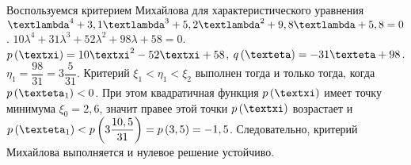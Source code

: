 \documentclass[a5paper,10pt]{article}
\begin{document}
Воспользуемся критерием Михайлова для характеристического уравнения 
$\lambda^4 + 3,1\lambda^3 \linebreak + 5,2 \lambda^2 + 9,8\lambda + 5,8 = 0$. 
$10\lambda^4 + 31\lambda^3 + 52 \lambda^2 + 98\lambda + 58 = 0$. 
$p\br{\xi} = 10\xi^2 - 52\xi + 58$,
$q\br{\eta} = -31\eta + 98$.
$\eta_{1} = \dfrac {98} {31} = 3 \dfrac {5}{31}$.
Критерий $\xi_{1} < \eta_{1} < \xi_{2}$ выполнен тогда и только тогда, когда $p\br{\eta_{1}} < 0$. При этом квадратичная функция $p\br{\xi}$ имеет точку минимума $\xi_{0} = 2,6$, значит правее этой точки $p\br{\xi}$ возрастает и 
$p\br{\eta_{1}} < p\br{3 \dfrac {10,5} {31}} = p\br{3,5} = -1,5$. Следовательно, критерий Михайлова выполняется и нулевое решение устойчиво.
\end{document}
